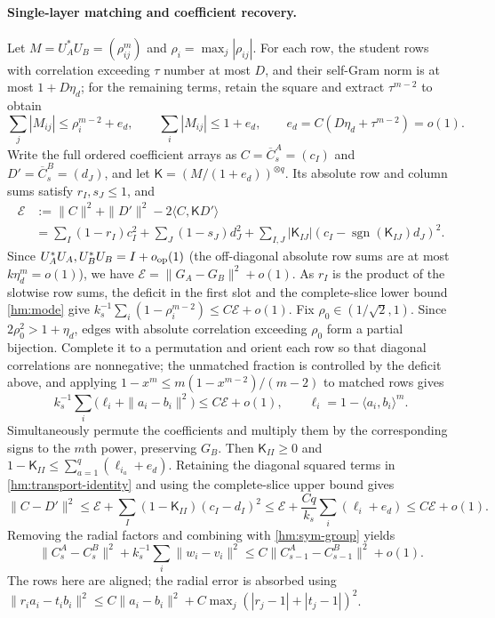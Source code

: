 \documentclass[a4paper]{tufte-handout}
\begin{document}
\begin{fullwidth}
\paragraph{Single-layer matching and coefficient recovery.}
Let $M=U_A^*U_B=(\rho_{ij}^m)$ and $\rho_i=\max_j|\rho_{ij}|$.
For each row, the student rows with correlation exceeding $\tau$ number at most $D$, and their self-Gram norm is at most $1+D\eta_d$;
for the remaining terms, retain the square and extract $\tau^{m-2}$ to obtain
\begin{equation}\label{hm:cross-power}
 \sum_j|M_{ij}|\le\rho_i^{m-2}+e_d,\qquad
 \sum_i|M_{ij}|\le1+e_d,\qquad
 e_d=C(D\eta_d+\tau^{m-2})=o(1).
\end{equation}
Write the full ordered coefficient arrays as $C=\overline C_s^A=(c_I)$ and $D'=\overline C_s^B=(d_J)$,
and let $\mathsf K=(M/(1+e_d))^{\otimes q}$. Its absolute row and column sums satisfy $r_I,s_J\le1$, and
\begin{equation}\label{hm:transport-identity}
 \begin{aligned}
 \mathcal E&:=\|C\|^2+\|D'\|^2-2\langle C,\mathsf K D'\rangle\\
 &=\sum_I(1-r_I)c_I^2+\sum_J(1-s_J)d_J^2
 +\sum_{I,J}|\mathsf K_{IJ}|(c_I-\operatorname{sgn}(\mathsf K_{IJ})d_J)^2.
 \end{aligned}
\end{equation}
Since $U_A^*U_A,U_B^*U_B=I+o_{\rm op}(1)$ (the off-diagonal absolute row sums are at most $k\eta_d^m=o(1)$),
we have $\mathcal E=\|G_A-G_B\|^2+o(1)$.
As $r_I$ is the product of the slotwise row sums, the deficit in the first slot and the complete-slice lower bound \eqref{hm:mode} give
$k_s^{-1}\sum_i(1-\rho_i^{m-2})\le C\mathcal E+o(1)$.
Fix $\rho_0\in(1/\sqrt2,1)$. Since $2\rho_0^2>1+\eta_d$, edges with absolute correlation exceeding $\rho_0$ form a partial bijection.
Complete it to a permutation and orient each row so that diagonal correlations are nonnegative; the unmatched fraction is controlled by the deficit above,
and applying $1-x^m\le m(1-x^{m-2})/(m-2)$ to matched rows gives
\begin{equation}\label{hm:row-loss}
 k_s^{-1}\sum_i\big(\ell_i+\|a_i-b_i\|^2\big)\le C\mathcal E+o(1),
 \qquad \ell_i=1-\langle a_i,b_i\rangle^m.
\end{equation}
Simultaneously permute the coefficients and multiply them by the corresponding signs to the $m$th power, preserving $G_B$.
Then $\mathsf K_{II}\ge0$ and $1-\mathsf K_{II}\le\sum_{a=1}^q(\ell_{i_a}+e_d)$.
Retaining the diagonal squared terms in \eqref{hm:transport-identity} and using the complete-slice upper bound gives
\[
 \|C-D'\|^2\le\mathcal E+\sum_I(1-\mathsf K_{II})(c_I-d_I)^2
 \le\mathcal E+\frac{Cq}{k_s}\sum_i(\ell_i+e_d)\le C\mathcal E+o(1).
\]
Removing the radial factors and combining with \eqref{hm:sym-group} yields
\begin{equation}\label{hm:recover}
 \|C_s^A-C_s^B\|^2+k_s^{-1}\sum_i\|w_i-v_i\|^2
 \le C\|C_{s-1}^A-C_{s-1}^B\|^2+o(1).
\end{equation}
The rows here are aligned; the radial error is absorbed using
$\|r_ia_i-t_ib_i\|^2\le C\|a_i-b_i\|^2+C\max_j(|r_j-1|+|t_j-1|)^2$.


\end{fullwidth}
\end{document}
